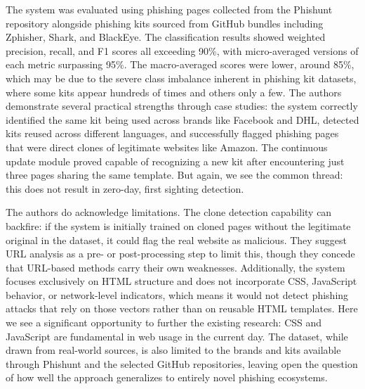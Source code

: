 \documentclass[conference]{IEEEtran}
\begin{document}
The system was evaluated using phishing pages collected from the Phishunt repository alongside phishing kits sourced from GitHub bundles including Zphisher, Shark, and BlackEye\cite{brezeanu_phish_2025}. The classification results showed weighted precision, recall, and F1 scores all exceeding 90\%, with micro-averaged versions of each metric surpassing 95\%. The macro-averaged scores were lower, around 85\%, which may be due to the severe class imbalance inherent in phishing kit datasets, where some kits appear hundreds of times and others only a few\cite{brezeanu_phish_2025}. The authors demonstrate several practical strengths through case studies: the system correctly identified the same kit being used across brands like Facebook and DHL, detected kits reused across different languages, and successfully flagged phishing pages that were direct clones of legitimate websites like Amazon. The continuous update module proved capable of recognizing a new kit after encountering just three pages sharing the same template\cite{brezeanu_phish_2025}. But again, we see the common thread: this does not result in zero-day, first sighting detection.

The authors do acknowledge limitations. The clone detection capability can backfire: if the system is initially trained on cloned pages without the legitimate original in the dataset, it could flag the real website as malicious\cite{brezeanu_phish_2025}. They suggest URL analysis as a pre- or post-processing step to limit this, though they concede that URL-based methods carry their own  weaknesses. Additionally, the system focuses exclusively on HTML structure and does not incorporate CSS, JavaScript behavior, or network-level indicators, which means it would not detect phishing attacks that rely on those vectors rather than on reusable HTML templates. Here we see a significant opportunity to further the existing research: CSS and JavaScript are fundamental in web usage in the current day. The dataset, while drawn from real-world sources, is also limited to the brands and kits available through Phishunt and the selected GitHub repositories, leaving open the question of how well the approach generalizes to entirely novel phishing ecosystems\cite{brezeanu_phish_2025}.
\end{document}
